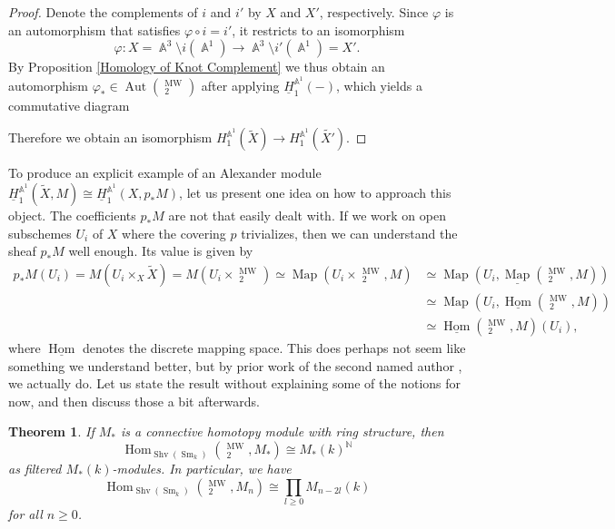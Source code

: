 \documentclass[english]{amsart}
\newtheorem{thm}[prop]{Theorem}
\theoremstyle{definition}
\DeclareMathOperator{\N}{\mathbb{N}}
\DeclareMathOperator{\A}{\mathbb{A}}
\DeclareMathOperator{\Hom}{Hom}
\DeclareMathOperator{\Aut}{Aut}
\DeclareMathOperator{\Map}{Map}
\DeclareMathOperator{\Sm}{Sm}
\DeclareMathOperator{\Shv}{Shv}
\DeclareMathOperator{\KK}{\underline{K}}
\DeclareMathOperator{\MW}{MW}
\begin{document}
\begin{proof}
Denote the complements of $i$ and $i'$ by $X$ and $X'$, respectively. Since $\varphi$ is an automorphism that satisfies $\varphi \circ i = i'$, it restricts to an isomorphism
$$\varphi \colon X = \A^3 \setminus i(\A^1) \rightarrow \A^3 \setminus i'(\A^1) = X'.$$
By Proposition \ref{Homology of Knot Complement} we thus obtain an automorphism $\varphi_* \in \Aut(\KK^{\MW}_2)$ after applying $\underline{H}_1^{\A^1}(-)$, which yields a commutative diagram
\begin{center}
\end{center}
Therefore we obtain an isomorphism $H_1^{\A^1}\!(\widetilde{X}) \rightarrow H_1^{\A^1}\!(\widetilde{X'})$.
\end{proof}
To produce an explicit example of an Alexander module $\underline{H}_1^{\A^1}\!(\widetilde{X},M) \cong \underline{H}_1^{\A^1}\!(X,p_*M)$, let us present one idea on how to approach this object. The coefficients $p_*M$ are not that easily dealt with. If we work on open subschemes $U_i$ of $X$ where the covering $p$ trivializes, then we can understand the sheaf $p_*M$ well enough. Its value is given by
\begin{align*}
p_*M(U_i) = M(U_i \times_X \widetilde{X}) = M(U_i \times \KK^{\MW}_2) \simeq \Map(U_i \times \KK^{\MW}_2, M) & \simeq \Map(U_i,\underline{\Map}(\KK^{\MW}_2, M)) \\ & \simeq \Map(U_i, \underline{\Hom}(\KK^{\MW}_2,M)) \\ & \simeq \underline{\Hom}(\KK^{\MW}_2,M)(U_i),
\end{align*}
where $\underline{\Hom}$ denotes the discrete mapping space. This does perhaps not seem like something we understand better, but by prior work of the second named author \cite{MR4874195}, we actually do. Let us state the result without explaining some of the notions for now, and then discuss those a bit afterwards.
\begin{thm}\label{Homs out of KMW}
If $M_*$ is a connective homotopy module with ring structure, then 
$$\Hom_{\Shv(\Sm_k)}(\KK^{\MW}_2,M_*) \cong M_*(k)^{\N}$$
as filtered $M_*(k)$-modules. In particular, we have
$$\Hom_{\Shv(\Sm_k)}(\KK^{\MW}_2,M_n) \cong \prod_{l \geq 0} M_{n-2l}(k)$$
for all $n \geq 0$.
\end{thm}
\end{document}

